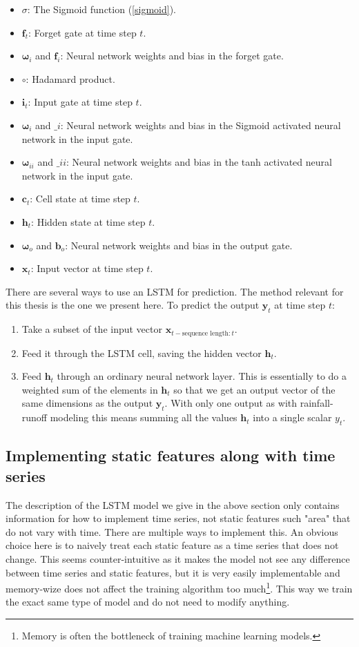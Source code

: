 \begin{itemize}
    \item $\sigma$: The Sigmoid function (\ref{sigmoid}).
    \item $\bm{f}_t$: Forget gate at time step $t$.
    \item $\bm{\omega}_i$ and $\bm{f}_i$: Neural network weights and bias in the forget gate.
    \item $\circ$: Hadamard product.
    \item $\bm{i}_t$: Input gate at time step $t$.
    \item $\bm{\omega}_i$ and $\bm_i$: Neural network weights and bias in the Sigmoid activated neural network in the input gate.
    \item $\bm{\omega}_{ii}$ and $\bm_{ii}$: Neural network weights and bias in the tanh activated neural network in the input gate.
    \item $\bm{c}_t$: Cell state at time step $t$.
    \item $\bm{h}_t$: Hidden state at time step $t$.
    \item $\bm{\omega}_o$ and $\bm{b}_o$: Neural network weights and bias in the output gate.
    \item $\bm{x}_t$: Input vector at time step $t$.
\end{itemize}
There are several ways to use an LSTM for prediction. The method relevant for this 
thesis is the one we present here.
To predict the output $\bm{y}_t$ at time step $t$:
\begin{enumerate}
    \item Take a subset of the input vector $\bm{x}_{t-\text{sequence length}:t}$.
    \item Feed it through the LSTM cell, saving the hidden vector $\bm{h}_t$.
    \item Feed $\bm{h}_t$ through an ordinary neural network layer. This is essentially to do a weighted sum of the elements in $\bm{h}_t$ so that we get an output vector of the same dimensions as the output $\bm{y}_t$. With only one output as with rainfall-runoff modeling this means summing all the values $\bm{h}_t$ into a single scalar $y_t$.
\end{enumerate}
\subsection{Implementing static features along with time series}
The description of the LSTM model we give in the above section only contains information 
for how to implement time series, not static features such "area" that do not vary 
with time. There are multiple ways to implement this. An obvious choice here is to 
naively treat each static feature as a time series that does not change. This seems 
counter-intuitive as it makes the model not see any difference between time series and 
static features, but it is very easily implementable and memory-wize does not affect 
the training algorithm too much\footnote{Memory is often the bottleneck of training 
machine learning models. \citationneeded}. This way we train the exact same type 
of model and do not need to modify anything.

